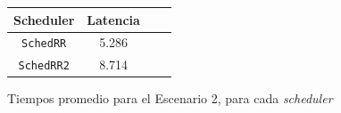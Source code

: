 \begin{figure}[H]
    \begin{center}
        \begin{tabular}{|c|c|c|c|}
            \hline
            \textbf{Scheduler} & \textbf{Latencia}\\ \hline
            \texttt{SchedRR}   & 5.286 \\
            \texttt{SchedRR2}  & 8.714 \\ \hline
        \end{tabular}
        \caption{Tiempos promedio para el Escenario 2, para cada \emph{scheduler}}
    \end{center}
\end{figure}
